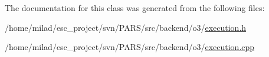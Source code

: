 The documentation for this class was generated from the following files:\begin{DoxyCompactItemize}
\item 
/home/milad/esc\_\-project/svn/PARS/src/backend/o3/\hyperlink{o3_2execution_8h}{execution.h}\item 
/home/milad/esc\_\-project/svn/PARS/src/backend/o3/\hyperlink{o3_2execution_8cpp}{execution.cpp}\end{DoxyCompactItemize}
